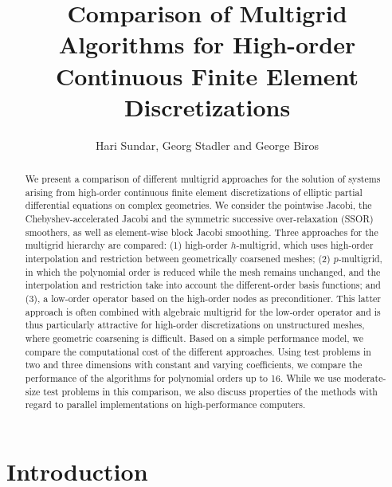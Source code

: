 \documentclass[smallcondensed,final]{svjour3}     %
\begin{document}

\title{Comparison of Multigrid Algorithms for High-order
  Continuous Finite Element Discretizations}
\author{Hari Sundar, Georg Stadler and George Biros}


\maketitle

\begin{abstract}
We present a comparison of different multigrid
approaches for the solution of systems arising from high-order
continuous finite element discretizations of elliptic partial
differential equations on complex geometries.  We consider the
pointwise Jacobi, the Chebyshev-accelerated Jacobi and the symmetric
successive over-relaxation (SSOR) smoothers, as well as
element-wise block Jacobi smoothing. Three approaches for the
multigrid hierarchy are compared: (1) high-order $h$-multigrid, which
uses high-order interpolation and restriction between geometrically
coarsened meshes; (2) $p$-multigrid, in which the polynomial order is
reduced while the mesh remains unchanged, and the interpolation and
restriction take into account the different-order basis functions; and
(3), a low-order operator based on the high-order nodes as
preconditioner. This latter approach is often combined with algebraic multigrid for
the low-order operator and is thus particularly attractive
for high-order discretizations on unstructured meshes, where geometric
coarsening is difficult.  Based on a simple performance model, we
compare the computational cost of the different approaches.  Using
test problems in two and three dimensions with constant and varying
coefficients, we compare the performance of the algorithms for
polynomial orders up to 16.  While we use moderate-size test problems
in this comparison, we also discuss properties of the methods with
regard to parallel implementations on high-performance computers.
\end{abstract}


\section{Introduction}
\end{document}
